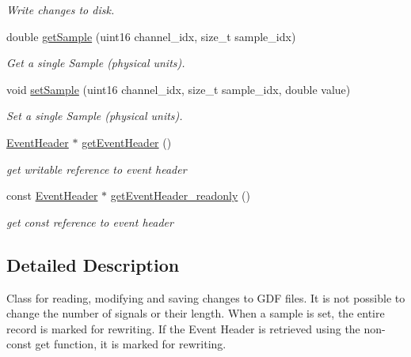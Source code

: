 \begin{DoxyCompactItemize}
\begin{DoxyCompactList}\small\item\em Write changes to disk. \item\end{DoxyCompactList}\item 
double \hyperlink{classgdf_1_1_modifier_aa5d1ba80d46c3cd55f3930b586e57585}{getSample} (uint16 channel\_\-idx, size\_\-t sample\_\-idx)
\begin{DoxyCompactList}\small\item\em Get a single Sample (physical units). \item\end{DoxyCompactList}\item 
void \hyperlink{classgdf_1_1_modifier_a7466a9097151cbb0176936bc979d01d9}{setSample} (uint16 channel\_\-idx, size\_\-t sample\_\-idx, double value)
\begin{DoxyCompactList}\small\item\em Set a single Sample (physical units). \item\end{DoxyCompactList}\item 
\hypertarget{classgdf_1_1_modifier_ababfb7e1503c8030a821059a78980348}{
\hyperlink{classgdf_1_1_event_header}{EventHeader} $\ast$ \hyperlink{classgdf_1_1_modifier_ababfb7e1503c8030a821059a78980348}{getEventHeader} ()}
\label{classgdf_1_1_modifier_ababfb7e1503c8030a821059a78980348}

\begin{DoxyCompactList}\small\item\em get writable reference to event header \item\end{DoxyCompactList}\item 
\hypertarget{classgdf_1_1_modifier_a1067dfac1c4d09ebe5b892e6eee7ed81}{
const \hyperlink{classgdf_1_1_event_header}{EventHeader} $\ast$ \hyperlink{classgdf_1_1_modifier_a1067dfac1c4d09ebe5b892e6eee7ed81}{getEventHeader\_\-readonly} ()}
\label{classgdf_1_1_modifier_a1067dfac1c4d09ebe5b892e6eee7ed81}

\begin{DoxyCompactList}\small\item\em get const reference to event header \item\end{DoxyCompactList}\end{DoxyCompactItemize}


\subsection{Detailed Description}
Class for reading, modifying and saving changes to GDF files. It is not possible to change the number of signals or their length. When a sample is set, the entire record is marked for rewriting. If the Event Header is retrieved using the non-\/const get function, it is marked for rewriting. 

